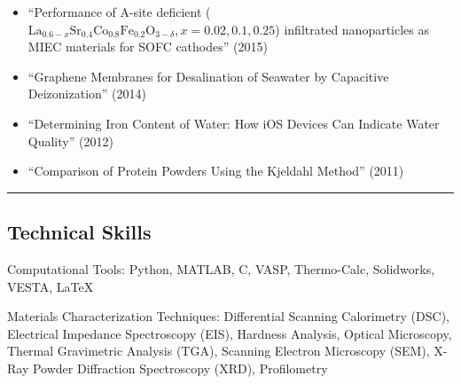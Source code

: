 \documentclass[10pt,letterpaper]{article}
\newenvironment{indentsection}[1]%
{\begin{list}{}%
  {\setlength{\leftmargin}{#1}}%
  \item[]%
}
{\end{list}}
\newcommand{\CPP}
{C\nolinebreak[4]\hspace{-.05em}\raisebox{.22ex}{\footnotesize\bf ++}}
\begin{document}
\begin{itemize}
  \parskip=0.1em

  \item ``Performance of A-site deficient ($\text{La}_{0.6-x}\text{Sr}_{0.4}\text{Co}_{0.8}\text{Fe}_{0.2}\text{O}_{3-\delta}, x = 0.02, 0.1, 0.25$) infiltrated nanoparticles as MIEC materials for SOFC cathodes'' (2015)
  \item ``Graphene Membranes for Desalination of Seawater by Capacitive Deizonization'' (2014)
  \item ``Determining Iron Content of Water: How iOS Devices Can Indicate Water Quality'' (2012)
  \item ``Comparison of Protein Powders Using the Kjeldahl Method'' (2011)
\end{itemize}


\hrule
\vspace{-0.6em}
\subsection*{Technical Skills}

\begin{indentsection}{\parindent}
\begin{description*}
  \item[Computational Tools:]
  Python, MATLAB, \CPP, VASP, Thermo-Calc, Solidworks, VESTA, \LaTeX
  \item[Materials Characterization Techniques:]
  Differential Scanning Calorimetry (DSC), Electrical Impedance Spectroscopy (EIS), Hardness Analysis, Optical Microscopy, Thermal Gravimetric Analysis (TGA), Scanning Electron Microscopy (SEM), X-Ray Powder Diffraction Spectroscopy (XRD), Profilometry

\end{description*}
\end{indentsection}
\end{document}
